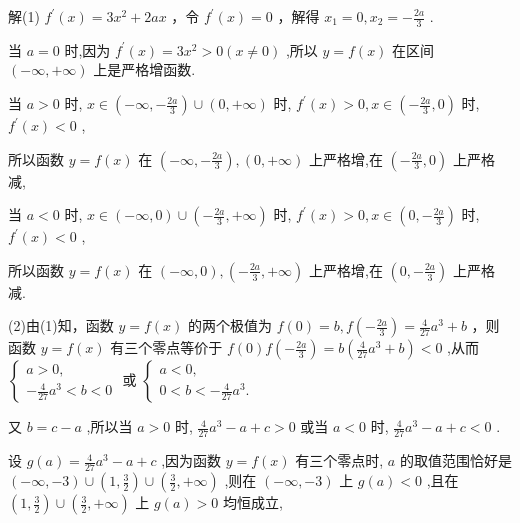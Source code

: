\documentclass[10pt]{article}
\begin{document}
解(1) \({f}^{\prime }\left( x\right)  = 3{x}^{2} + {2ax}\) ，令 \({f}^{\prime }\left( x\right)  = 0\) ，解得 \({x}_{1} = 0,{x}_{2} =  - \frac{2a}{3}\) .

当 \(a = 0\) 时,因为 \({f}^{\prime }\left( x\right)  = 3{x}^{2} > 0\left( {x \neq  0}\right)\) ,所以 \(y = f\left( x\right)\) 在区间 \(\left( {-\infty , + \infty }\right)\) 上是严格增函数.

当 \(a > 0\) 时, \(x \in  \left( {-\infty , - \frac{2a}{3}}\right)  \cup  \left( {0, + \infty }\right)\) 时, \({f}^{\prime }\left( x\right)  > 0,x \in  \left( {-\frac{2a}{3},0}\right)\) 时, \({f}^{\prime }\left( x\right)  < 0\) ,

所以函数 \(y = f\left( x\right)\) 在 \(\left( {-\infty , - \frac{2a}{3}}\right) ,\left( {0, + \infty }\right)\) 上严格增,在 \(\left( {-\frac{2a}{3},0}\right)\) 上严格减,

当 \(a < 0\) 时, \(x \in  \left( {-\infty ,0}\right)  \cup  \left( {-\frac{2a}{3}, + \infty }\right)\) 时, \({f}^{\prime }\left( x\right)  > 0,x \in  \left( {0, - \frac{2a}{3}}\right)\) 时, \({f}^{\prime }\left( x\right)  < 0\) ,

所以函数 \(y = f\left( x\right)\) 在 \(\left( {-\infty ,0}\right) ,\left( {-\frac{2a}{3}, + \infty }\right)\) 上严格增,在 \(\left( {0, - \frac{2a}{3}}\right)\) 上严格减.

(2)由(1)知，函数 \(y = f\left( x\right)\) 的两个极值为 \(f\left( 0\right)  = b,f\left( {-\frac{2a}{3}}\right)  = \frac{4}{27}{a}^{3} + b\) ，则函数 \(y = f\left( x\right)\) 有三个零点等价于 \(f\left( 0\right) f\left( {-\frac{2a}{3}}\right)  = b\left( {\frac{4}{27}{a}^{3} + b}\right)  < 0\) ,从而 \(\left\{  \begin{array}{l} a > 0, \\   - \frac{4}{27}{a}^{3} < b < 0 \end{array}\right.\) 或 \(\left\{  \begin{array}{l} a < 0, \\  0 < b <  - \frac{4}{27}{a}^{3}. \end{array}\right.\)

又 \(b = c - a\) ,所以当 \(a > 0\) 时, \(\frac{4}{27}{a}^{3} - a + c > 0\) 或当 \(a < 0\) 时, \(\frac{4}{27}{a}^{3} - a + c < 0\) .

设 \(g\left( a\right)  = \frac{4}{27}{a}^{3} - a + c\) ,因为函数 \(y = f\left( x\right)\) 有三个零点时, \(a\) 的取值范围恰好是 \(\left( {-\infty , - 3}\right)  \cup  \left( {1,\frac{3}{2}}\right)  \cup  \left( {\frac{3}{2}, + \infty }\right)\) ,则在 \(\left( {-\infty , - 3}\right)\) 上 \(g\left( a\right)  < 0\) ,且在 \(\left( {1,\frac{3}{2}}\right)  \cup  \left( {\frac{3}{2}, + \infty }\right)\) 上 \(g\left( a\right)  > 0\) 均恒成立,
\end{document}
